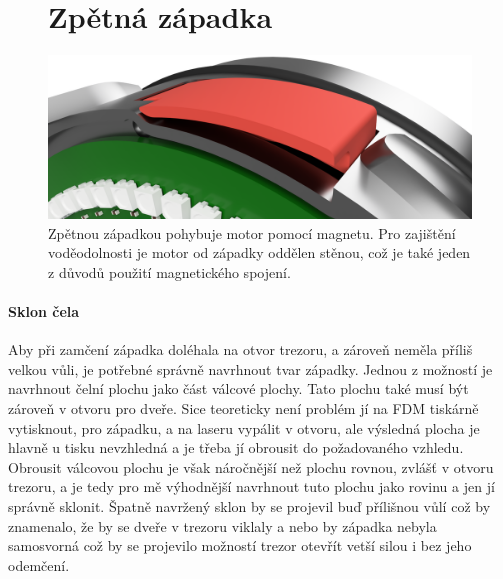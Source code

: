 \begin{figure}[zapadka]
    \section*{Zpětná západka}
    \centering
    \includegraphics[width=\textwidth]{kapitoly/obrazky/E4/zapadka/render.png}
    \caption{Zpětnou západkou pohybuje motor pomocí magnetu. Pro zajištění voděodolnosti je motor od západky oddělen stěnou, což je také jeden z důvodů použití magnetického spojení.}
    \label{fig:zapadka}
\end{figure}

\clearpage
\newpage

\paragraph{Sklon čela}

Aby při zamčení západka doléhala na otvor trezoru, a zároveň neměla příliš velkou vůli, je potřebné správně navrhnout tvar západky.
Jednou z možností je navrhnout čelní plochu jako část válcové plochy. Tato plochu také musí být zároveň v otvoru pro dveře.
Sice teoreticky není problém jí na FDM tiskárně vytisknout, pro západku, a na laseru vypálit v otvoru, ale výsledná plocha je hlavně u tisku 
nevzhledná a je třeba jí obrousit do požadovaného vzhledu. Obrousit válcovou plochu je však náročnější než plochu rovnou, zvlášť v otvoru trezoru, 
a je tedy pro mě výhodnější navrhnout tuto plochu jako rovinu a jen jí správně sklonit. Špatně navržený sklon by se projevil buď přílišnou vůlí 
což by znamenalo, že by se dveře v trezoru viklaly a nebo by západka nebyla samosvorná což by se projevilo možností trezor otevřít vetší silou 
i bez jeho odemčení.

